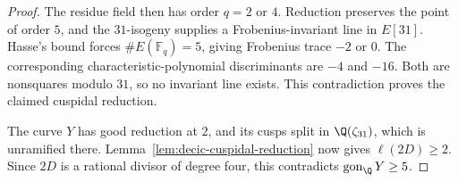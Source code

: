 \begin{proof}
The residue field then has order $q=2$ or $4$. Reduction preserves
the point of order $5$, and the $31$-isogeny supplies a
Frobenius-invariant line in $E[31]$. Hasse's bound forces
$\#E(\mathbb F_q)=5$, giving Frobenius trace $-2$ or $0$.
The corresponding characteristic-polynomial discriminants are
$-4$ and $-16$. Both are nonsquares modulo $31$, so no invariant
line exists. This contradiction proves the claimed cuspidal reduction.

The curve $Y$ has good reduction at $2$, and its cusps split in
$\Q(\zeta_{31})$, which is unramified there.
Lemma~\ref{lem:decic-cuspidal-reduction} now gives
$\ell(2D)\geq2$. Since $2D$ is a rational divisor of degree four,
this contradicts $\operatorname{gon}_{\Q}Y\geq5$.
\end{proof}
